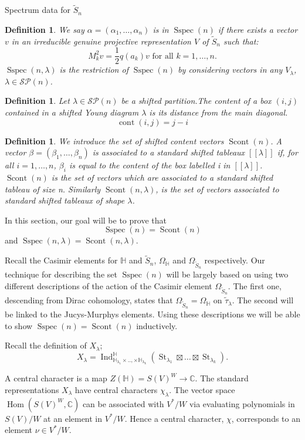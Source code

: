 \documentclass[a4paper,10pt]{amsart}
\newtheorem{definition}[theorem]{Definition}
\DeclareMathOperator{\cont}{cont}
\DeclareMathOperator{\Ind}{Ind}
\DeclareMathOperator{\St}{St}
\DeclareMathOperator{\Sspec}{Sspec}
\DeclareMathOperator{\Scont}{Scont}
\DeclareMathOperator{\Hom}{Hom}
\begin{document}
\begin{section}{Spectrum data for $\tilde{S}_n$}
\begin{definition}\label{spec}\cite{VS08} 
We say $\alpha = (\alpha_1,\ldots ,\alpha_n)$ is in $\Sspec(n)$ if there exists a vector $v$ in an irreducible genuine projective representation $V$ of $\tilde{S}_n$ such that: 
$$M_k^2 v = \frac{1}{2}q(a_k) v \text{ for all } k=1,\ldots ,n.$$
$\Sspec(n, \lambda)$ is the restriction of $\Sspec(n)$ by considering vectors in any $V_\lambda$, $\lambda \in \mathcal{SP}(n)$.  \end{definition} 

\begin{definition} Let $\lambda \in \mathcal{SP}(n)$ be a shifted partition.The content of a box $(i,j)$ contained in a shifted Young diagram $\lambda$ is its distance from the main diagonal.
$$\cont(i,j) = j-i$$ \end{definition}

\begin{definition} We introduce the set of shifted content vectors $\Scont(n)$. 
A vector $\beta = (\beta_1,\ldots ,\beta_n)$ is associated to a standard shifted tableaux $[[\lambda]]$ if, for all $i=1,\ldots ,n$, $\beta_i$ is equal to the content of the box labelled i in $[[\lambda]]$. 
$\Scont(n)$ is the set of vectors which are associated to a standard shifted tableau of size n. Similarly $\Scont(n,\lambda)$, is the set of vectors associated to standard shifted tableaux of shape $\lambda$. \end{definition}
In this section, our goal will be to prove that 
$$\Sspec(n) =\Scont(n)$$
 and $\Sspec(n,\lambda) = \Scont(n,\lambda)$.

Recall the Casimir elements for $\mathbb{H}$ and $\tilde{S}_n$, $\Omega_{\mathbb{H}}$ and $\Omega_{\tilde{S}_n}$ respectively. 
Our technique for describing the set $\Sspec(n)$ will be largely based on using two different descriptions of the action of the Casimir element $\Omega_{\tilde{S}_n}$. The first one, descending from Dirac cohomology, states that $\Omega_{\tilde{S}_n} = \Omega_{\mathbb{H}}$ on $\tilde{\tau}_\lambda$. The second will be linked to the Jucys-Murphys elements. Using these descriptions we will be able to show $\Sspec(n) = \Scont(n)$ inductively. 

Recall the definition of $X_\lambda$;
$$X_\lambda = \Ind_{\mathbb{H}_{\lambda_1}\times..,\times\mathbb{H}_{\lambda_k}}^\mathbb{H}(\St_{\lambda_1} \boxtimes \ldots  \boxtimes \St_{\lambda_k}).$$ 

A central character is a map $Z(\mathbb{H}) = S(V)^W \to \mathbb{C}$. The standard representations $X_\lambda$ have central characters $\chi_\lambda$.  The vector space $\Hom(S(V)^W, \mathbb{C})$ can be associated with $V^*/W$ via evaluating polynomials in $S(V)/W$ at an element in $V^*/W$. Hence a central character, $\chi$, corresponds to an element $\nu \in V^*/W$. 


\end{section}
\end{document}
